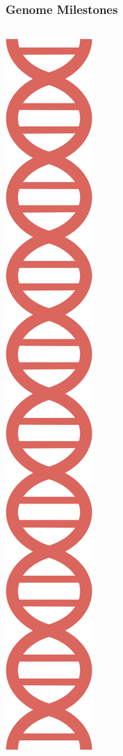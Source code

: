 \documentclass{beamer}
\begin{document}
\begin{frame}
	
	\frametitle{Genome Milestones}
	
	\begin{columns}
		\begin{column}{0.1\textwidth}
			\includegraphics[keepaspectratio, width  =\textwidth]{img/dnaCartoon}
		\end{column}
		\begin{column}{0.9\textwidth}


\end{column}
\end{columns}
\end{frame}
\end{document}
